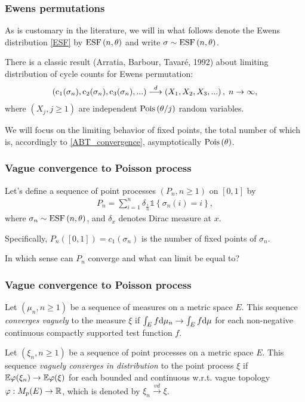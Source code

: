 \documentclass[12pt,pdf,aspectratio=169,t]{beamer}
\begin{document}
    \begin{frame}
        \frametitle{Ewens permutations}
        As is customary in the literature, we will in what follows denote
        the Ewens distribution \eqref{ESF} by $\mathrm{ESF}\left(n, \theta\right)$ and write
        $\sigma \sim \mathrm{ESF}\left(n, \theta\right)$.

        There is a classic result (Arratia, Barbour, Tavaré, 1992)
        about limiting distribution of cycle counts for Ewens permutation:
        \begin{gather}\label{ABT_convergence}
            \left(\operatorname{c}_1(\sigma_n), \operatorname{c}_2(\sigma_n), \operatorname{c}_3(\sigma_n), ...\right)
            \overset{d}{\longrightarrow}
            \left(X_1, X_2, X_3, ...\right), \; n\to\infty,
        \end{gather}
        where $\left(X_j, j \geq 1\right)$ are independent
        $\mathrm{Pois}\left(\theta / j\right)$ random variables.

        We will focus on the limiting behavior of fixed points, the total
        number of which is, accordingly to \eqref{ABT_convergence},
        asymptotically $\mathrm{Pois}\left(\theta\right)$.
    \end{frame}
    \begin{frame}
        \frametitle{Vague convergence to Poisson process}
        Let's define a sequence of point processes $\left(P_n, n \geq 1\right)$ on $[0, 1]$
        by
        \begin{gather}\label{Pn_def}
            P_n = \sum_{i=1}^n \delta_{\frac{i}{n}} \mathds{1} \left\{\sigma_n(i) = i\right\},
        \end{gather}
        where $\sigma_n \sim \mathrm{ESF}\left(n, \theta\right)$, and $\delta_x$ denotes Dirac measure at $x$.

        Specifically, $P_n([0, 1]) = c_1(\sigma_n)$ is the number of fixed points of $\sigma_n$.
        
        In which sense can $P_n$ converge and what can limit be equal to?
    \end{frame}
    \begin{frame}
        \frametitle{Vague convergence to Poisson process}
        \begin{definition}
            Let $\left(\mu_n, n \geq 1\right)$ be a sequence of
            measures on a metric space $E$. This sequence 
            \emph{converges vaguely} to the measure $\xi$ if
            $\int_E f \mathrm{d} \mu_n \to \int_E f \mathrm{d} \mu$ for each
            non-negative continuous compactly supported test function $f$.
        \end{definition}
        \begin{definition}
            Let $\left(\xi_n, n\geq 1\right)$ be a sequence of
            point processes on a metric space $E$. This sequence
            \emph{vaguely converges in distribution} to the point process $\xi$ if
            $\mathbb{E}\varphi(\xi_n) \to \mathbb{E}\varphi(\xi)$ for each
            bounded and continuous w.r.t. vague topology
            $\varphi: M_p(E) \to \mathbb{R}$, 
            which is denoted by 
            $\xi_n \overset{vd}{\longrightarrow} \xi$.
        \end{definition}
    \end{frame}
\end{document}

